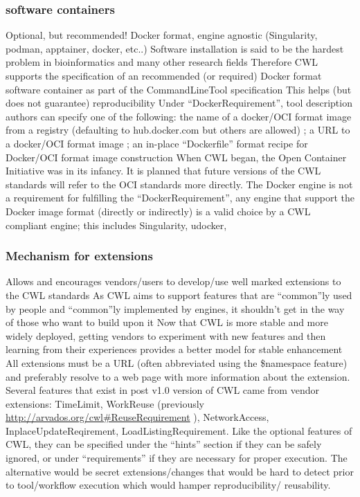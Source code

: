 \subsubsection{software containers}
Optional, but recommended! Docker format, engine agnostic (Singularity, podman, apptainer, docker, etc..)
Software installation is said to be the hardest problem in bioinformatics and many other research fields
Therefore CWL supports the specification of an recommended (or required) Docker format software container as part of the CommandLineTool specification
This helps (but does not guarantee) reproducibility
Under “DockerRequirement”, tool description authors can specify one of the following: the name of a docker/OCI format image from a registry (defaulting to hub.docker.com but others are allowed) ; a URL to a docker/OCI format image ; an in-place “Dockerfile” format recipe for Docker/OCI format image construction
When CWL began, the Open Container Initiative was in its infancy. It is planned that future versions of the CWL standards will refer to the OCI standards more directly. The Docker engine is not a requirement for fulfilling the “DockerRequirement”, any engine that support the Docker image format (directly or indirectly) is a valid choice by a CWL compliant engine; this includes Singularity, udocker,
\subsubsection{Mechanism for extensions}
Allows and encourages vendors/users to develop/use well marked extensions to the CWL standards
As CWL aims to support features that are “common”ly used by people and “common”ly implemented by engines, it shouldn’t get in the way of those who want to build upon it
Now that CWL is more stable and more widely deployed, getting vendors to experiment with new features and then learning from their experiences provides a better model for stable enhancement
All extensions must be a URL (often abbreviated using the \$namespace feature) and preferably resolve to a web page with more information about the extension. Several features that exist in post v1.0 version of CWL came from vendor extensions: TimeLimit, WorkReuse (previously \url{http://arvados.org/cwl#ReuseRequirement} ), NetworkAccess, InplaceUpdateReqirement, LoadListingRequirement. Like the optional features of CWL, they can be specified under the “hints” section if they can be safely ignored, or under “requirements” if they are necessary for proper execution.
The alternative would be secret extensions/changes that would be hard to detect prior to tool/workflow execution which would hamper reproducibility/ reusability.
